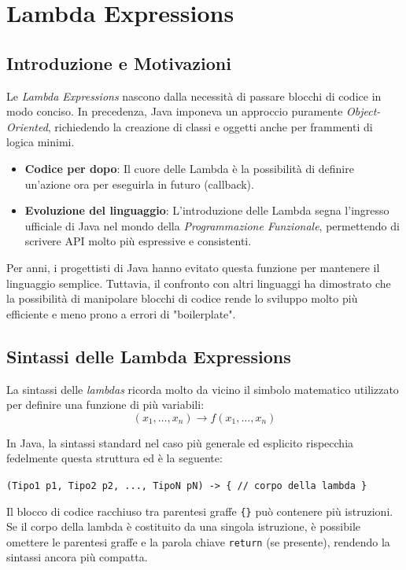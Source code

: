 \section{Lambda Expressions}
\subsection{Introduzione e Motivazioni}

Le \textit{Lambda Expressions} nascono dalla necessità di passare blocchi di codice in modo conciso. In precedenza, Java imponeva un approccio puramente \textit{Object-Oriented}, richiedendo la creazione di classi e oggetti anche per frammenti di logica minimi.

\begin{itemize}
    \item \textbf{Codice per dopo}: Il cuore delle Lambda è la possibilità di definire un'azione ora per eseguirla in futuro (callback).
    \item \textbf{Evoluzione del linguaggio}: L'introduzione delle Lambda segna l'ingresso ufficiale di Java nel mondo della \textit{Programmazione Funzionale}, permettendo di scrivere API molto più espressive e consistenti.
\end{itemize}
\vspace{\baselineskip}
Per anni, i progettisti di Java hanno evitato questa funzione per mantenere il linguaggio semplice. Tuttavia, il confronto con altri linguaggi ha dimostrato che la possibilità di manipolare blocchi di codice rende lo sviluppo molto più efficiente e meno prono a errori di "boilerplate".

\subsection{Sintassi delle Lambda Expressions}

La sintassi delle \textit{lambdas} ricorda molto da vicino il simbolo matematico utilizzato per definire una funzione di più variabili:
\[ (x_1, \dots, x_n) \to f(x_1, \dots, x_n) \]

In Java, la sintassi standard nel caso più generale ed esplicito rispecchia fedelmente questa struttura ed è la seguente:

\begin{center}
    \texttt{(Tipo1 p1, Tipo2 p2, ..., TipoN pN) -> \{ // corpo della lambda \}}
\end{center}

Il blocco di codice racchiuso tra parentesi graffe \texttt{\{\}} può contenere più istruzioni. Se il corpo della lambda è costituito da una singola istruzione, è possibile omettere le parentesi graffe e la parola chiave \texttt{return} (se presente), rendendo la sintassi ancora più compatta.

